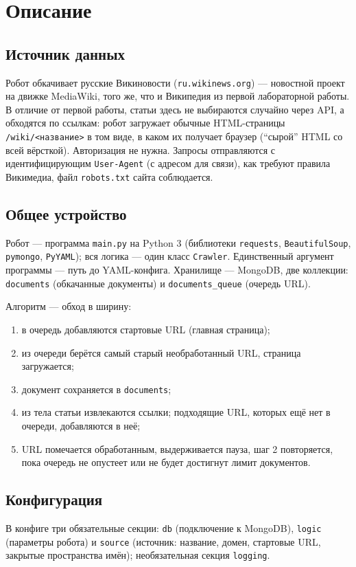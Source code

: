 \section{Описание}

\subsection{Источник данных}
Робот обкачивает русские Викиновости (\texttt{ru.wikinews.org}) --- новостной
проект на движке MediaWiki, того же, что и Википедия из первой лабораторной
работы. В отличие от первой работы, статьи здесь не выбираются случайно через
API, а обходятся по ссылкам: робот загружает обычные HTML-страницы
\texttt{/wiki/<название>} в том виде, в каком их получает браузер
(\enquote{сырой} HTML со всей вёрсткой). Авторизация не нужна. Запросы
отправляются с идентифицирующим \texttt{User-Agent} (с адресом для связи), как
требуют правила Викимедиа, файл \texttt{robots.txt} сайта соблюдается.

\subsection{Общее устройство}
Робот --- программа \texttt{main.py} на Python 3 (библиотеки \texttt{requests},
\texttt{BeautifulSoup}, \texttt{pymongo}, \texttt{PyYAML}); вся логика --- один
класс \texttt{Crawler}. Единственный аргумент программы --- путь до YAML-конфига.
Хранилище --- MongoDB, две коллекции: \texttt{documents} (обкачанные документы)
и \texttt{documents\_queue} (очередь URL).

Алгоритм --- обход в ширину:
\begin{enumerate}
    \item в очередь добавляются стартовые URL (главная страница);
    \item из очереди берётся самый старый необработанный URL, страница
    загружается;
    \item документ сохраняется в \texttt{documents};
    \item из тела статьи извлекаются ссылки; подходящие URL, которых ещё нет в
    очереди, добавляются в неё;
    \item URL помечается обработанным, выдерживается пауза, шаг 2 повторяется,
    пока очередь не опустеет или не будет достигнут лимит документов.
\end{enumerate}

\subsection{Конфигурация}
В конфиге три обязательные секции: \texttt{db} (подключение к MongoDB),
\texttt{logic} (параметры робота) и \texttt{source} (источник: название, домен,
стартовые URL, закрытые пространства имён); необязательная секция
\texttt{logging}.

